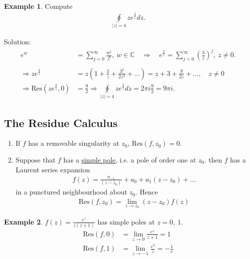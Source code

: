 \documentclass[12pt, a4paper]{article}
\theoremstyle{plain}
\theoremstyle{definition}
\newtheorem{example}{Example} %
\begin{document}
		\begin{example}
			Compute
			\begin{align*}
				\oint\limits_{|z|=4}ze^{\frac{3}{z}}dz.
			\end{align*}

			Solution:
			\begin{align*}
				e^w &= \sum\limits_{j=0}^{\infty}\frac{w^j}{j!},\:w\in \mathbb{C}\quad\Rightarrow\quad
				e^{\frac{3}{z}} = \sum\limits_{j=0}^{\infty}\left(\frac{3}{z}\right)^j,\:z\not=0.\\\\
				\Rightarrow ze^{\frac{3}{z}} &= z\left(1+\frac{3}{z}+\frac{3^2}{2z^2}+\ldots\right) = z+3+\frac{9}{2z}+\ldots,\quad z\not=0\\
				\Rightarrow \mathrm{Res}(ze^{\frac{3}{z}},0) &= \frac{9}{2} \Rightarrow \oint\limits_{|z|=4}ze^{\frac{3}{z}}dz = 2\pi i \frac{9}{2} = 9\pi i.
			\end{align*}
		\end{example}

		\subsection{The Residue Calculus} %
		\label{sub:the_residue_calculus}
			\begin{enumerate}
				\item If $f$ has a removable singularity at $z_0$, $\mathrm{Res}(f,z_0) = 0$.
				\item Suppose that $f$ has a \underline{simple pole}, i.e. a pole of order one at $z_0$. then $f$ has a Laurent series expansion 
				\begin{align*}
					f(z) = \frac{a_{-1}}{(z-z_0)} + a_0 + a_1(z-z_0)+\ldots
				\end{align*}
				in a punctured neighbourhood about $z_0$. Hence
				\begin{align*}
					\mathrm{Res}(f,z_0) = \lim\limits_{z\to z_0}(z-z_0)f(z)
				\end{align*}
			\end{enumerate}

			\begin{example}
				$\displaystyle f(z)=\frac{e^z}{z(z+1)}$ has simple poles at $z=0,\:1$.
				\begin{align*}
					\mathrm{Res}(f,0) &= \lim\limits_{z\to 0} \frac{e^z}{z+1} = 1\\
					\mathrm{Res}(f,1) &= \lim\limits_{z\to -1} \frac{e^2}{z} = - \frac{1}{e}
				\end{align*}
			\end{example}
\end{document}
